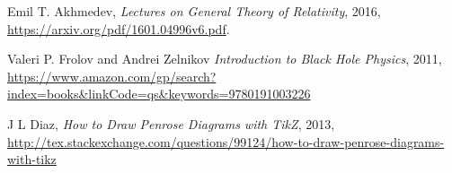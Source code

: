 \documentclass[]{article}
\begin{document}
\begin{thebibliography}{9}
	\raggedright	
	Emil T. Akhmedev,
	\emph{Lectures on General Theory of Relativity},
	2016,
	\url{https://arxiv.org/pdf/1601.04996v6.pdf}.
	
	Valeri P. Frolov and Andrei Zelnikov
	\emph{Introduction to Black Hole Physics},
	2011,
	\url{https://www.amazon.com/gp/search?index=books&linkCode=qs&keywords=9780191003226}
	
	J L Diaz,
	\emph{How to Draw Penrose Diagrams with TikZ},
	2013,
	\url{http://tex.stackexchange.com/questions/99124/how-to-draw-penrose-diagrams-with-tikz}
\end{thebibliography}
\end{document}
